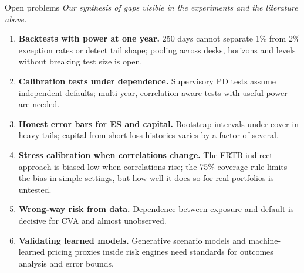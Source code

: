 \begin{frame}{Open problems}
  \small
  \textit{Our synthesis of gaps visible in the experiments and the literature above.}
  \begin{enumerate}
    \item \textbf{Backtests with power at one year.} 250 days cannot separate 1\% from 2\% exception rates or detect tail shape; pooling across desks, horizons and levels without breaking test size is open.
    \item \textbf{Calibration tests under dependence.} Supervisory PD tests assume independent defaults; multi-year, correlation-aware tests with useful power are needed.
    \item \textbf{Honest error bars for ES and capital.} Bootstrap intervals under-cover in heavy tails; capital from short loss histories varies by a factor of several.
    \item \textbf{Stress calibration when correlations change.} The FRTB indirect approach is biased low when correlations rise; the 75\% coverage rule limits the bias in simple settings, but how well it does so for real portfolios is untested.
    \item \textbf{Wrong-way risk from data.} Dependence between exposure and default is decisive for CVA and almost unobserved.
    \item \textbf{Validating learned models.} Generative scenario models and machine-learned pricing proxies inside risk engines need standards for outcomes analysis and error bounds.
  \end{enumerate}
\end{frame}
